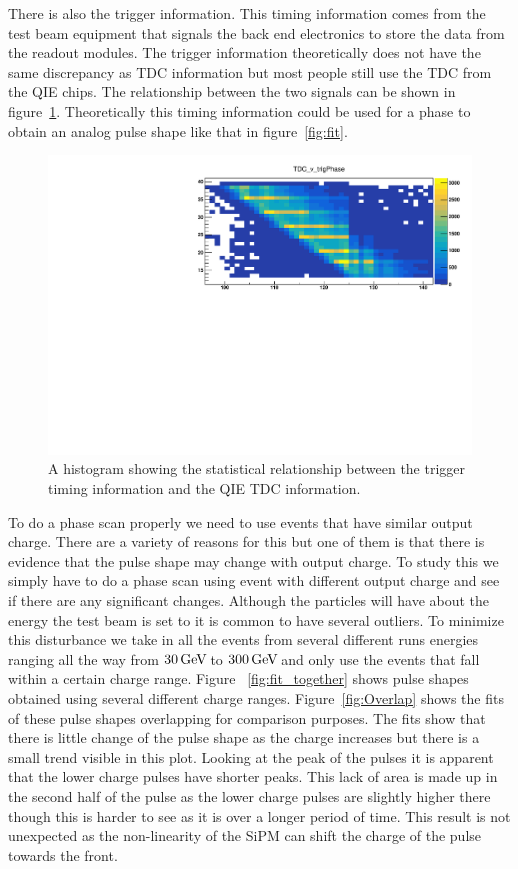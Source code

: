 There is also the trigger information. This timing information comes from the test beam equipment that signals the back end electronics to store the data from the readout modules. The trigger information theoretically does not have the same discrepancy as TDC information but most people still use the TDC from the QIE chips. The relationship between the two signals can be shown in figure~\ref{fig:tdc}. Theoretically this timing information could be used for a phase to obtain an analog pulse shape like that in figure~\ref{fig:fit}.

\begin{figure}
\centering
\includegraphics[width=\linewidth]{Figures/zoom.pdf}
\caption{A histogram showing the statistical relationship between the trigger timing information and the QIE TDC information.}
\label{fig:tdc}
\end{figure}


To do a phase scan properly we need to use events that have similar output charge. There are a variety of reasons for this but one of them is that there is evidence that the pulse shape may change with output charge. To study this we simply have to do a phase scan using event with different output charge and see if there are any significant changes. Although the particles will have about the energy the test beam is set to it is common to have several outliers. To minimize this disturbance we take in all the events from several different runs energies ranging all the way from $30 {\,\text{Ge\hspace{-.08em}V\hspace{-0.16em}}}$ to $300 {\,\text{Ge\hspace{-.08em}V\hspace{-0.16em}}}$ and only use the events that fall within a certain charge range. Figure ~\ref{fig:fit_together} shows pulse shapes obtained using several different charge ranges. Figure~\ref{fig:Overlap} shows the fits of these pulse shapes overlapping for comparison purposes. The fits show that there is little change of the pulse shape as the charge increases but there is a small trend visible in this plot. Looking at the peak of the pulses it is apparent that the lower charge pulses have shorter peaks. This lack of area is made up in the second half of the pulse as the lower charge pulses are slightly higher there though this is harder to see as it is over a longer period of time. This result is not unexpected as the non-linearity of the SiPM can shift the charge of the pulse towards the front. 


